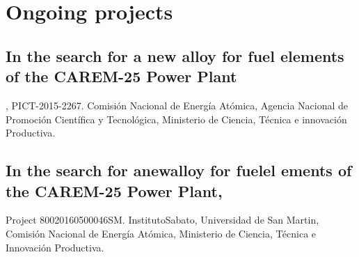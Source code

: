 \section{Ongoing projects}

\subsection{ In the search for a new alloy for fuel elements of the CAREM-25 Power Plant}, PICT-2015-2267. Comisión Nacional de Energía Atómica, Agencia Nacional de Promoción Científica y Tecnológica, Ministerio de Ciencia, Técnica e innovación Productiva.

\subsection{In the search for anewalloy for fuelel ements of the CAREM-25 Power Plant, }Project 80020160500046SM. InstitutoSabato, Universidad de San Martin, Comisión Nacional de Energía Atómica, Ministerio de Ciencia, Técnica e Innovación Productiva.

